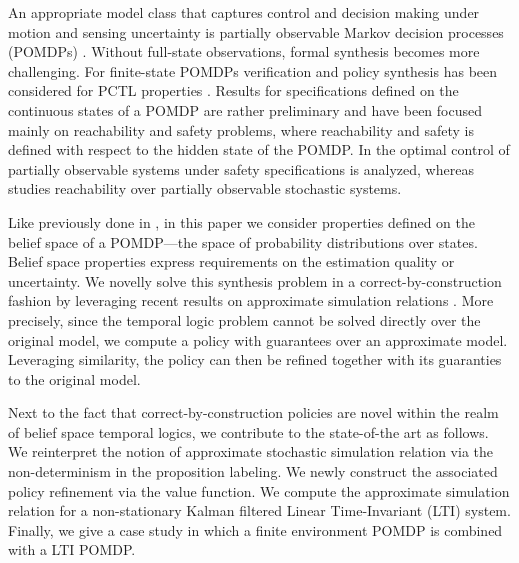 \documentclass{ifacconf}
\newcommand{\new}[1]{{\color{blue}#1}}
\begin{document}
An appropriate model class that captures control and decision making under motion and sensing uncertainty is partially observable Markov decision processes (POMDPs) \citep{Kaelbling98,Smallwood73}. Without full-state observations, formal synthesis becomes more challenging. For finite-state POMDPs verification and policy synthesis has been considered for PCTL properties \citep{Norman2017, Chatterjee2014}. Results for specifications defined on the continuous states of a POMDP are rather preliminary and have been focused mainly on reachability and safety problems, where reachability and safety is defined with respect to the hidden state of the POMDP. In \citep{ding2013optimal} the optimal control of partially observable systems under safety specifications is analyzed, whereas \citep{LESSER20141989} studies reachability over partially observable stochastic systems.

Like previously done in  \citep{Vasile2016,JonesDTL2013}, in this paper we consider properties defined on the belief space of a POMDP---the space of probability distributions over states. Belief space properties express requirements on the estimation quality or uncertainty. We novelly solve this synthesis problem in a  correct-by-construction fashion by leveraging recent results on  approximate simulation relations \citep{haesaert2017verification, tech_report_TACAS}.
More precisely, since the temporal logic problem cannot be solved directly over the original model, we compute a policy with guarantees over an approximate model. Leveraging similarity, the policy can then be refined together with  its guaranties  to the original model.

\new{Next to the fact that correct-by-construction policies are novel within the realm of belief space temporal logics, we contribute to the state-of-the art as follows.
 We reinterpret the notion of approximate stochastic simulation relation via the non-determinism in the proposition labeling. We newly construct the associated policy refinement via the value function. We compute the approximate simulation relation for a non-stationary Kalman filtered  Linear Time-Invariant (LTI) system.   Finally,  we give a case study in which a finite environment POMDP is combined with a LTI POMDP.}

\end{document}
